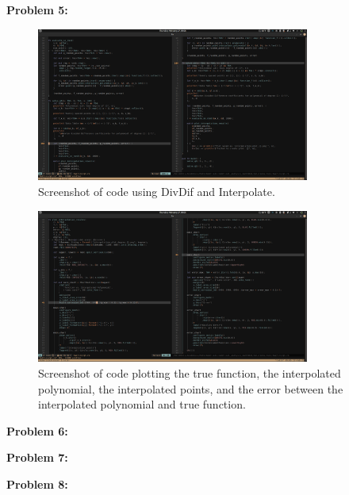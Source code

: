 \documentclass[12pt, letterpaper]{article}
\theoremstyle{nonumberplain}
\begin{document}
\hspace{18pt}\textbf{Problem 5:} \medskip
\begin{figure}[ht]
	\centering
	\includegraphics[width=0.8\textwidth]{numhw2q5.png}
	\caption{Screenshot of code using DivDif and Interpolate.}
\end{figure}

\begin{figure}[ht]
	\centering
	\includegraphics[width=0.8\textwidth]{numhw2q5_plotfunction.png}
	\caption{Screenshot of code plotting the true function, the interpolated polynomial, the interpolated points, and the error between the interpolated polynomial and true function.}
\end{figure}

\hspace{18pt}\textbf{Problem 6:} \medskip

\hspace{18pt}\textbf{Problem 7:} \medskip

\hspace{18pt}\textbf{Problem 8:} \medskip
\end{document}
